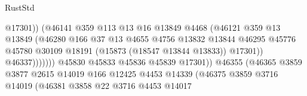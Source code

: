\begin{lexlean}{RustStd}
\begin{coremodule}
                                                  @17301))
                                              (@46141
                                                @359
                                                @113
                                                @13
                                                @16
                                                @13849
                                                @4468
                                                (@46121
                                                  @359
                                                  @13
                                                  @13849
                                                  (@46280
                                                    @166
                                                    @37
                                                    @13
                                                    @4655
                                                    @4756
                                                    @13832
                                                    @13844
                                                    @46295
                                                    @45776
                                                    @45780
                                                    @30109
                                                    @18191
                                                    (@15873 (@18547 @13844 @13833))
                                                    @17301))
                                                @46337)))))))
                                  @45830
                                  @45833
                                  @45836
                                  @45839
                                  @17301))
                              @46355
                              (@46365
                                @3859
                                @3877
                                @2615
                                @14019
                                @166
                                @12425
                                @4453
                                @14339
                                (@46375
                                  @3859
                                  @3716
                                  @14019
                                  (@46381
                                    @3858
                                    @22
                                    @3716
                                    @4453
                                    @14017

\end{coremodule}
\end{lexlean}
